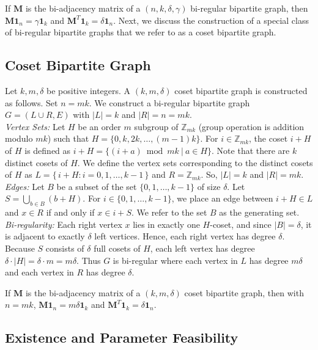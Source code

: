 \documentclass[journal,draftcls,onecolumn]{IEEEtran}
\theoremstyle{mystyle}
\newcommand{\bfM}{\mathbf{M}}
\begin{document}
If $\bfM$ is the bi-adjacency matrix of a $(n,k,\delta, \gamma)$ bi-regular bipartite graph, then $\mathbf{M} \mathbf{1}_n = \gamma \mathbf{1}_k$ and $\mathbf{M}^T \mathbf{1}_k = \delta \mathbf{1}_n$. Next, we discuss the construction of a special class of bi-regular bipartite graphs that we refer to as a coset bipartite graph.  

\subsection{Coset Bipartite Graph}
Let $k,m,\delta$ be positive integers. A $(k, m, \delta)$ coset bipartite graph is constructed as follows. Set $n = mk$. 
We construct a bi-regular bipartite graph $G = (L \cup R, E)$ with $|L| = k$ and $|R| = n = mk$.\\
\textit{Vertex Sets:}
Let $H$ be an order $m$ subgroup of $\mathbb{Z}_{mk}$ (group operation is addition modulo $mk$) such that $H = \{0, k, 2k, \dots, (m-1)k\}$. For $i \in \mathbb{Z}_{mk}$, the coset $i+H$ of $H$ is defined as $i + H = \{ (i + a) \bmod mk \ | \ a \in H\}$. Note that there are $k$ distinct cosets of $H$.
We define the vertex sets corresponding to the distinct cosets of $H$ as $L = \{\, i+H : i=0,1,\dots,k-1 \,\}$ and  
$R = \mathbb{Z}_{mk}$. So, $|L| = k$ and $|R| = mk$.\\
\textit{Edges:} Let $B$ be a subset of the set $\{0,1, \dots, k-1\}$ of size $\delta$. Let $S = \bigcup_{b \in B} (b+H)$. For $i \in \{0,1,\dots,k-1\}$, we place an edge between $i+H \in L$ and $x \in R$ if and only if
$x \in i+S$. We refer to the set $B$ as the generating set.\\
\textit{Bi-regularity:} Each right vertex $x$ lies in exactly one $H$-coset, and since $|B|=\delta$, it is adjacent
to exactly $\delta$ left vertices. Hence, each right vertex has degree $\delta$.
Because $S$ consists of $\delta$ full cosets of $H$, each left vertex has degree
$
\delta \cdot |H|=\delta \cdot m = m\delta.
$
Thus $G$ is bi-regular where each vertex in $L$ has degree $m\delta$ and each vertex in $R$ has degree $\delta$.

If $\bfM$ is the bi-adjacency matrix of a $(k,m,\delta)$ coset bipartite graph, then with $n=mk$, $\mathbf{M} \mathbf{1}_n = m \delta \mathbf{1}_k$ and $\mathbf{M}^T \mathbf{1}_k = \delta \mathbf{1}_n$.




\subsection{Existence and Parameter Feasibility}
\end{document}
